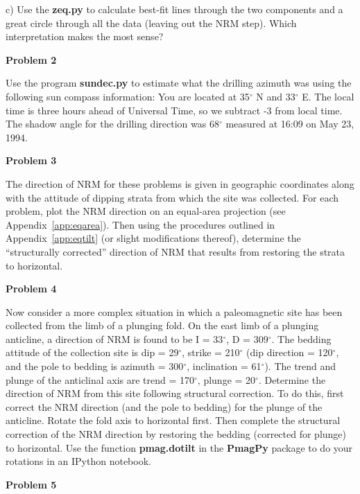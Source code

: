 {c) Use the {\bf zeq.py} to calculate best-fit lines through the two components and a great circle through all the data (leaving out the NRM step).  Which interpretation makes the most sense?  



\eject


{\bf Problem 2 }

Use the program {\bf sundec.py}  to estimate what the drilling azimuth was using the following sun compass information:   You are located at 35$^{\circ}$ N and 33$^{\circ}$ E.  The local
time is three hours ahead of Universal Time, so we subtract -3 from local time.  The shadow angle for the
drilling direction was 68$^{\circ}$ measured at 16:09 on May 23, 1994.

{\bf Problem 3}

The direction of NRM  for these problems is given in geographic coordinates along with the
attitude of dipping strata from which the site was collected.  For each problem, plot the NRM direction on an equal-area
projection (see Appendix~\ref{app:eqarea}). 
Then using the procedures outlined in Appendix~\ref{app:eqtilt} (or slight modifications thereof), determine
the ``structurally corrected'' direction of NRM that results from restoring the strata to horizontal.

{\bf Problem 4}

Now consider a more complex situation in which a paleomagnetic site has been collected from the
limb of a plunging fold. On the east limb of a plunging anticline, a direction of NRM is found to be
I = 33$^{\circ}$, D = 309$^{\circ}$. The bedding attitude of the collection site is dip = 29$^{\circ}$, strike = 210$^{\circ}$ (dip direction = 120$^{\circ}$, and the pole to bedding is azimuth = 300$^{\circ}$, inclination = 61$^{\circ}$). The trend and plunge of the
anticlinal axis are trend = 170$^{\circ}$, plunge = 20$^{\circ}$. Determine the direction of NRM from this site following
structural correction. To do this, first correct the NRM direction (and the pole to bedding) for the
plunge of the anticline. Rotate the fold axis to horizontal first. Then complete the structural correction of the NRM direction by restoring
the bedding (corrected for plunge) to horizontal.   Use the function {\bf pmag.dotilt } in the {\bf PmagPy} package to do your rotations in an IPython notebook.    






{\bf Problem 5}  

}
